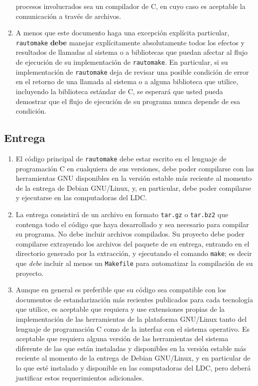 \documentclass[]{article}
\begin{document}
\begin{enumerate}[1.]
  procesos involucrados sea un compilador de C, en cuyo caso es
  aceptable la comunicación a través de archivos.
\item
  A menos que este documento haga una excepción explícita particular,
  \texttt{rautomake} \textbf{debe} manejar explícitamente absolutamente
  todos los efectos y resultados de llamadas al sistema o a bibliotecas
  que puedan afectar al flujo de ejecución de su implementación de
  \texttt{rautomake}. En particular, si su implementación de
  \texttt{rautomake} deja de revisar una posible condición de error en
  el retorno de una llamada al sistema o a alguna biblioteca que
  utilice, incluyendo la biblioteca estándar de C, se esperará que usted
  pueda demostrar que el flujo de ejecución de su programa nunca depende
  de esa condición.
\end{enumerate}
\subsection{Entrega}

\begin{enumerate}[1.]
\item
  El código principal de \texttt{rautomake} debe estar escrito en el
  lenguaje de programación C en cualquiera de sus versiones, debe poder
  compilarse con las herramientas GNU disponibles en la versión estable
  más reciente al momento de la entrega de Debian GNU/Linux, y, en
  particular, debe poder compilarse y ejecutarse en las computadoras del
  LDC.
\item
  La entrega consistirá de un archivo en formato \texttt{tar.gz} o
  \texttt{tar.bz2} que contenga todo el código que haya desarrollado y
  sea necesario para compilar su programa. No debe incluir archivos
  compilados. Su proyecto debe poder compilarse extrayendo los archivos
  del paquete de su entrega, entrando en el directorio generado por la
  extracción, y ejecutando el comando \texttt{make}; es decir que
  \emph{debe} incluir al menos un \texttt{Makefile} para automatizar la
  compilación de su proyecto.
\item
  Aunque en general es preferible que su código sea compatible con los
  documentos de estandarización más recientes publicados para cada
  tecnología que utilice, es aceptable que requiera y use extensiones
  propias de la implementación de las herramientas de la plataforma
  GNU/Linux tanto del lenguaje de programación C como de la interfaz con
  el sistema operativo. Es aceptable que requiera alguna versión de las
  herramientas del sistema diferente de las que están instaladas y
  disponibles en la versión estable más reciente al momento de la
  entrega de Debian GNU/Linux, y en particular de lo que esté instalado
  y disponible en las computadoras del LDC, pero deberá justificar estos
  requerimientos adicionales.
\end{enumerate}
\pagebreak
\end{document}
